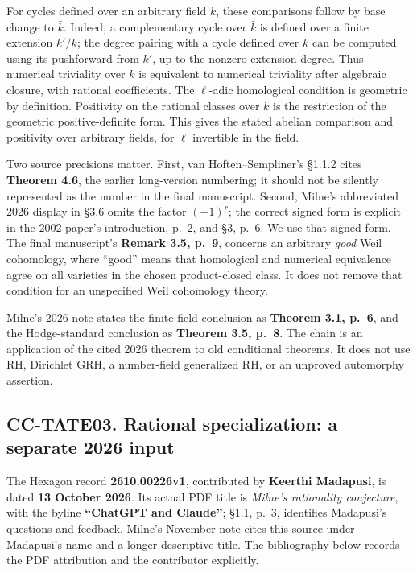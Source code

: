 \documentclass[11pt,a4paper]{article}
\theoremstyle{definition}\newtheorem{definition}[theorem]{Definition}
\theoremstyle{remark}\newtheorem{remark}[theorem]{Remark}
\begin{document}
For cycles defined over an arbitrary field \(k\), these comparisons
follow by base change to \(\bar k\). Indeed, a complementary cycle over
\(\bar k\) is defined over a finite extension \(k'/k\); the degree
pairing with a cycle defined over \(k\) can be computed using its
pushforward from \(k'\), up to the nonzero extension degree. Thus
numerical triviality over \(k\) is equivalent to numerical triviality
after algebraic closure, with rational coefficients. The \(\ell\)-adic
homological condition is geometric by definition. Positivity on the
rational classes over \(k\) is the restriction of the geometric
positive-definite form. This gives the stated abelian comparison and
positivity over arbitrary fields, for \(\ell\) invertible in the field.

Two source precisions matter. First, van Hoften--Sempliner's §1.1.2
cites \textbf{Theorem 4.6}, the earlier long-version numbering; it
should not be silently represented as the number in the final
manuscript. Second, Milne's abbreviated 2026 display in §3.6 omits the
factor \((-1)^r\); the correct signed form is explicit in the 2002
paper's introduction, p.~2, and §3, p.~6. We use that signed form. The
final manuscript's \textbf{Remark 3.5, p.~9}, concerns an arbitrary
\emph{good} Weil cohomology, where ``good'' means that homological and
numerical equivalence agree on all varieties in the chosen
product-closed class. It does not remove that condition for an
unspecified Weil cohomology theory.

Milne's 2026 note states the finite-field conclusion as \textbf{Theorem
3.1, p.~6}, and the Hodge-standard conclusion as \textbf{Theorem 3.5,
p.~8}. The chain is an application of the cited 2026 theorem to old
conditional theorems. It does not use RH, Dirichlet GRH, a number-field
generalized RH, or an unproved automorphy assertion.

\subsection{CC-TATE03. Rational specialization: a separate 2026
input}\label{cc-tate03.-rational-specialization-a-separate-2026-input}

The Hexagon record \textbf{2610.00226v1}, contributed by \textbf{Keerthi
Madapusi}, is dated \textbf{13 October 2026}. Its actual PDF title is
\emph{Milne's rationality conjecture}, with the byline \textbf{``ChatGPT
and Claude''}; §1.1, p.~3, identifies Madapusi's questions and feedback.
Milne's November note cites this source under Madapusi's name and a
longer descriptive title. The bibliography below records the PDF
attribution and the contributor explicitly.
\end{document}
